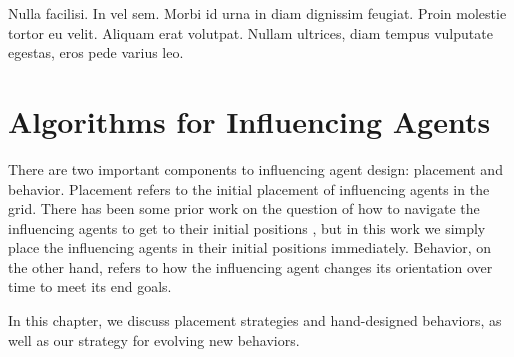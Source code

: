 \begin{savequote}[75mm]
Nulla facilisi. In vel sem. Morbi id urna in diam dignissim feugiat. Proin molestie tortor eu velit. Aliquam erat volutpat. Nullam ultrices, diam tempus vulputate egestas, eros pede varius leo.
\end{savequote}

\chapter{Algorithms for Influencing Agents}
\label{ch:influencing}
There are two important components to influencing agent design: placement and
behavior.
Placement refers to the initial placement of influencing agents in the grid.
There has been some prior work on the question of how to navigate the
influencing agents to get to their initial positions
\cite{genter2015placement}, but in this work we simply place the influencing
agents in their initial positions immediately.
Behavior, on the other hand, refers to how the influencing agent changes its
orientation over time to meet its end goals.

In this chapter, we discuss placement strategies and hand-designed behaviors,
as well as our strategy for evolving new behaviors.


